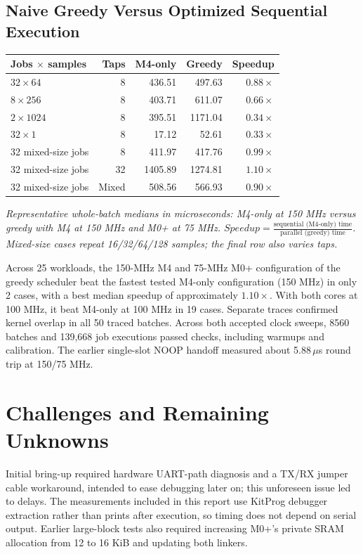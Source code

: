 \documentclass[10pt]{article}
\begin{document}
\subsection{Naive Greedy Versus Optimized Sequential Execution}
\begin{minipage}{\linewidth}
\begin{center}
\small
\begin{tabular}{@{}p{3.7cm}rrrr@{}}
\toprule
\textbf{Jobs $\times$ samples} & \textbf{Taps} & \textbf{M4-only} & \textbf{Greedy} & \textbf{Speedup} \\
\midrule
$32\times64$ & 8 & 436.51 & 497.63 & $0.88\times$ \\
$8\times256$ & 8 & 403.71 & 611.07 & $0.66\times$ \\
$2\times1024$ & 8 & 395.51 & 1171.04 & $0.34\times$ \\
$32\times1$ & 8 & 17.12 & 52.61 & $0.33\times$ \\
32 mixed-size jobs & 8 & 411.97 & 417.76 & $0.99\times$ \\
32 mixed-size jobs & 32 & 1405.89 & 1274.81 & $1.10\times$ \\
32 mixed-size jobs & Mixed & 508.56 & 566.93 & $0.90\times$ \\
\bottomrule
\end{tabular}
\end{center}
{\small\textit{Representative whole-batch medians in microseconds: M4-only at
150 MHz versus greedy with M4 at 150 MHz and M0+ at 75 MHz. $Speedup = \frac{\mbox{sequential (M4-only) time}}{\mbox{parallel (greedy) time}}$. Mixed-size cases repeat
16/32/64/128 samples; the final row also varies taps.}}
\end{minipage}

Across 25 workloads, the 150-MHz M4 and 75-MHz M0+ configuration of the greedy scheduler beat the fastest tested M4-only configuration (150 MHz) in only
2 cases, with a best median speedup of approximately $1.10\times$. With both cores at 100 MHz, it beat M4-only at 100 MHz in 19 cases. Separate traces confirmed
kernel overlap in all 50 traced batches. Across both accepted clock sweeps,
8560 batches and 139,668 job executions passed checks, including warmups and
calibration. The earlier single-slot NOOP handoff measured about 5.88\,$\mu$s
round trip at 150/75 MHz.

\newpage
\section{Challenges and Remaining Unknowns}
Initial bring-up required hardware UART-path diagnosis and a TX/RX jumper cable workaround, intended to ease debugging later on; this unforeseen issue led to delays. The measurements included in this report use
KitProg debugger extraction rather than prints after execution, so timing does not depend on serial output. Earlier large-block tests also required increasing M0+'s private SRAM allocation from 12 to 16 KiB and updating both linkers.
\end{document}
